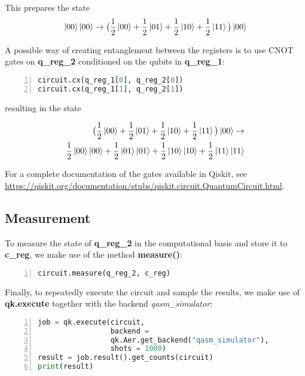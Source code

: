 This prepares the state 
\begin{equation*}
    \ket{00}\ket{00} \rightarrow 
    \big(\frac{1}{2}\ket{00} + \frac{1}{2}\ket{01} +
    \frac{1}{2}\ket{10} + \frac{1}{2}\ket{11}\big)\ket{00}  
\end{equation*}


A possible way of creating entanglement between the registers is to use CNOT gates on \textbf{q\_reg\_2} conditioned on the qubits in \textbf{q\_reg\_1}:


\begin{lstlisting}[language=python, numbers=left]
circuit.cx(q_reg_1[0], q_reg_2[0])
circuit.cx(q_reg_1[1], q_reg_2[1])
\end{lstlisting}
resulting in the state 

\begin{equation*}
\begin{aligned}
\big(\frac{1}{2}\ket{00} + \frac{1}{2}\ket{01} +
\frac{1}{2}\ket{10} + \frac{1}{2}\ket{11}\big)\ket{00} \rightarrow \\
\frac{1}{2}\ket{00}\ket{00} + \frac{1}{2}\ket{01}\ket{01} +
\frac{1}{2}\ket{10}\ket{10} + \frac{1}{2}\ket{11}\ket{11}
\end{aligned}
\end{equation*}


For a complete documentation of the gates available in Qiskit, see \url{https://qiskit.org/documentation/stubs/qiskit.circuit.QuantumCircuit.html}.

\subsection{Measurement}\label{sec:MeasurementQiskit}

To measure the state of \textbf{q\_reg\_2} in the computational basis and store it to \textbf{c\_reg}, we make use of the method \textbf{measure()}:

\begin{lstlisting}[language=python, numbers=left]
  circuit.measure(q_reg_2, c_reg)
\end{lstlisting}

Finally, to repeatedly execute the circuit and sample the results, we make use of \textbf{qk.execute} together with the backend \emph{qasm\_simulator}:


\begin{lstlisting}[language=python, numbers=left]
job = qk.execute(circuit, 
                 backend = 
                 qk.Aer.get_backend("qasm_simulator"),
                 shots = 1000)
result = job.result().get_counts(circuit)
print(result)
\end{lstlisting}


